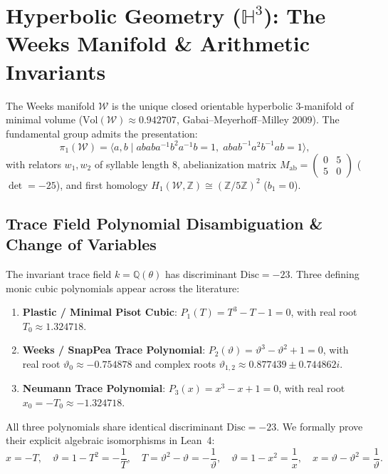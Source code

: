 \documentclass[11pt,a4paper]{article}
\begin{document}
\section{Hyperbolic Geometry ($\mathbb{H}^3$): The Weeks Manifold \& Arithmetic Invariants}
The Weeks manifold $\mathcal{W}$ is the unique closed orientable hyperbolic 3-manifold of minimal volume ($\mathrm{Vol}(\mathcal{W}) \approx 0.942707$, Gabai--Meyerhoff--Milley 2009). The fundamental group admits the presentation:
\begin{equation}
\pi_1(\mathcal{W}) = \langle a, b \mid a b a b a^{-1} b^2 a^{-1} b = 1, \; a b a b^{-1} a^2 b^{-1} a b = 1 \rangle,
\end{equation}
with relators $w_1, w_2$ of syllable length 8, abelianization matrix $M_{\mathrm{ab}} = \begin{pmatrix} 0 & 5 \\ 5 & 0 \end{pmatrix}$ ($\det = -25$), and first homology $H_1(\mathcal{W}, \mathbb{Z}) \cong (\mathbb{Z}/5\mathbb{Z})^2$ ($b_1 = 0$).

\subsection{Trace Field Polynomial Disambiguation \& Change of Variables}
The invariant trace field $k = \mathbb{Q}(\theta)$ has discriminant $\mathrm{Disc} = -23$. Three defining monic cubic polynomials appear across the literature:
\begin{enumerate}
\item \textbf{Plastic / Minimal Pisot Cubic}: $P_1(T) = T^3 - T - 1 = 0$, with real root $T_0 \approx 1.324718$.
\item \textbf{Weeks / SnapPea Trace Polynomial}: $P_2(\vartheta) = \vartheta^3 - \vartheta^2 + 1 = 0$, with real root $\vartheta_0 \approx -0.754878$ and complex roots $\vartheta_{1,2} \approx 0.877439 \pm 0.744862 i$.
\item \textbf{Neumann Trace Polynomial}: $P_3(x) = x^3 - x + 1 = 0$, with real root $x_0 = -T_0 \approx -1.324718$.
\end{enumerate}
All three polynomials share identical discriminant $\mathrm{Disc} = -23$. We formally prove their explicit algebraic isomorphisms in Lean~4:
\begin{equation}
x = -T, \quad \vartheta = 1 - T^2 = -\frac{1}{T}, \quad T = \vartheta^2 - \vartheta = -\frac{1}{\vartheta}, \quad \vartheta = 1 - x^2 = \frac{1}{x}, \quad x = \vartheta - \vartheta^2 = \frac{1}{\vartheta}.
\end{equation}
\end{document}
